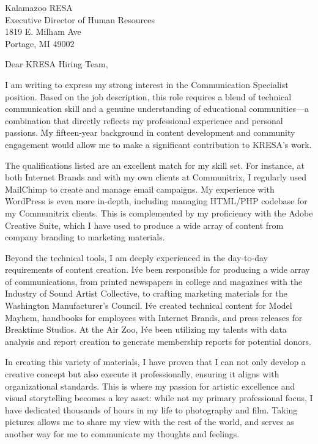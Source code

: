 \documentclass[12pt]{letter} %
\date{June 25, 2025 \vspace{-48pt}} %
\begin{document}
\begin{letter}{Kalamazoo RESA \\ Executive Director of Human Resources \\ 1819 E. Milham Ave \\ Portage, MI 49002}
	\opening{Dear KRESA Hiring Team,}

	I am writing to express my strong interest in the Communication Specialist position. Based on the job description, this role requires a blend of technical communication skill and a genuine understanding of educational communities—a combination that directly reflects my professional experience and personal passions. My fifteen-year background in content development and community engagement would allow me to make a significant contribution to KRESA’s work.

	The qualifications listed are an excellent match for my skill set. For instance, at both Internet Brands and with my own clients at Communitrix, I regularly used MailChimp to create and manage email campaigns. My experience with WordPress is even more in-depth, including managing HTML/PHP codebase for my Communitrix clients. This is complemented by my proficiency with the Adobe Creative Suite, which I have used to produce a wide array of content from company branding to marketing materials.

	Beyond the technical tools, I am deeply experienced in the day-to-day requirements of content creation. I\'ve been responsible for producing a wide array of communications, from printed newspapers in college and magazines with the Industry of Sound Artist Collective, to crafting marketing materials for the Washington Manufacturer’s Council. I\'ve created technical content for Model Mayhem, handbooks for employees with Internet Brands, and press releases for Breaktime Studios. At the Air Zoo, I\'ve been utilizing my talents with data analysis and report creation to generate membership reports for potential donors.
    
    In creating this variety of materials, I have proven that I can not only develop a creative concept but also execute it professionally, ensuring it aligns with organizational standards. This is where my passion for artistic excellence and visual storytelling becomes a key asset: while not my primary professional focus, I have dedicated thousands of hours in my life to photography and film. Taking pictures allows me to share my view with the rest of the world, and serves as another way for me to communicate my thoughts and feelings.


\end{letter}
\end{document}
